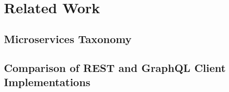 \section{Related Work}\label{sec:related}

\subsection{Microservices Taxonomy}

\subsection{Comparison of REST and GraphQL Client Implementations}